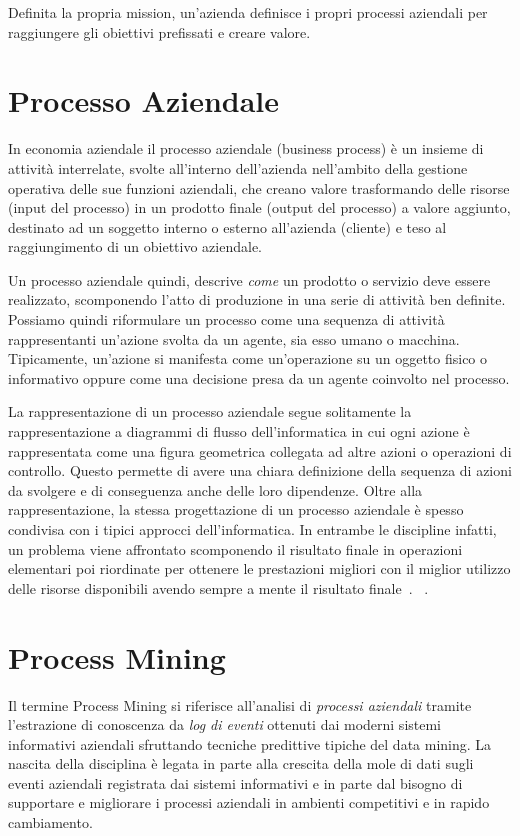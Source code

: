 \documentclass[12pt,a4paper]{report}
\begin{document}
    \medskip
    Definita la propria mission, un'azienda definisce i
    propri processi aziendali per raggiungere gli obiettivi
    prefissati e creare valore. 

    \section{Processo Aziendale}
    In economia aziendale il processo aziendale (business
    process) \`e un insieme di attivit\`a interrelate,
    svolte all'interno dell'azienda nell'ambito della
    gestione operativa delle sue funzioni aziendali,
    che creano valore trasformando delle risorse (input del
    processo) in un prodotto finale (output del processo) a
    valore aggiunto, destinato ad un soggetto interno o
    esterno all'azienda (cliente) e teso al raggiungimento
    di un obiettivo aziendale.

    \medskip
    Un processo aziendale quindi, descrive \textit{come} un
    prodotto o servizio deve essere realizzato, scomponendo
    l'atto di produzione in una serie di attivit\`a ben
    definite. Possiamo quindi riformulare un processo come 
    una sequenza di attivit\`a rappresentanti un'azione
    svolta da un agente, sia esso umano o macchina.
    Tipicamente, un'azione si manifesta come un'operazione
    su un oggetto fisico o informativo oppure come una 
    decisione presa da un agente coinvolto nel processo.

    \medskip
    La rappresentazione di un processo aziendale segue
    solitamente la rappresentazione a diagrammi di flusso
    dell'informatica in cui ogni azione \`e rappresentata
    come una figura geometrica collegata ad altre azioni
    o operazioni di controllo. Questo permette di avere una
    chiara definizione della sequenza di azioni da svolgere
    e di conseguenza anche delle loro dipendenze. Oltre 
    alla rappresentazione, la stessa progettazione di un 
    processo aziendale \`e spesso condivisa con i tipici
    approcci dell'informatica. In entrambe le 
    discipline infatti, un problema viene affrontato 
    scomponendo il risultato finale in operazioni 
    elementari poi riordinate per ottenere le prestazioni
    migliori con il miglior utilizzo delle risorse 
    disponibili avendo sempre a mente il risultato finale~\cite{business-process-handbook}.
    ~\cite{shankararaman2012business}.

    \section{Process Mining}
    Il termine Process Mining si riferisce all'analisi di 
    \textit{processi aziendali} tramite l'estrazione di
    conoscenza da \textit{log di eventi} ottenuti dai
    moderni sistemi informativi aziendali sfruttando 
    tecniche predittive tipiche del data mining.
    La nascita della disciplina \`e legata in parte alla
    crescita della mole di dati sugli eventi aziendali
    registrata dai sistemi informativi e in parte dal
    bisogno di supportare e migliorare i processi aziendali
    in ambienti competitivi e in rapido cambiamento.
\end{document}
